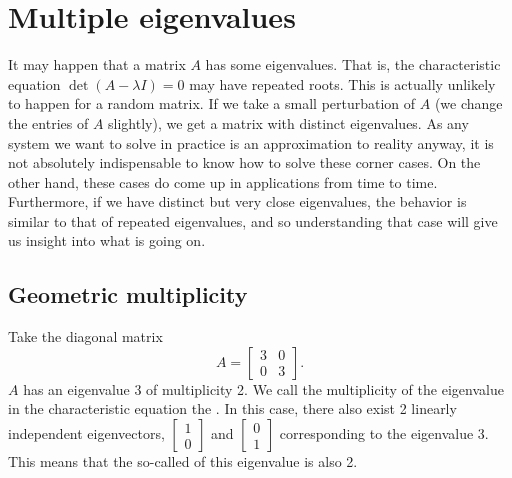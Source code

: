 
\sectionnewpage
\section{Multiple eigenvalues} \label{sec:multeigen}


It may happen that a matrix $A$ has some  eigenvalues.
That is, the characteristic equation $\det(A-\lambda I) = 0$ may have
repeated roots.  This is actually unlikely to happen
for a random matrix.  If we take a small perturbation of $A$ (we change the
entries of $A$ slightly), we get a matrix with distinct eigenvalues.  As
any system we want to solve in practice is an approximation to reality
anyway, it is not absolutely indispensable to know how to solve these
corner cases.  
On the other hand, these cases do come up in applications from time to time.
Furthermore, if we have distinct but very close eigenvalues, the behavior is
similar to that of repeated eigenvalues, and so understanding that case
will give us insight into what is going on.

\subsection{Geometric multiplicity}

Take the diagonal matrix
\begin{equation*}
A =
\begin{bmatrix}
3 & 0 \\ 0 & 3
\end{bmatrix} .
\end{equation*}
$A$ has an eigenvalue 3 of multiplicity 2.  We call the
multiplicity of the eigenvalue
in the characteristic equation the
\emph{}.  In this case, there also exist 2
linearly
independent eigenvectors,
$\left[ \begin{smallmatrix} 1 \\ 0 \end{smallmatrix} \right]$
and
$\left[ \begin{smallmatrix} 0 \\ 1 \end{smallmatrix} \right]$ corresponding
to the eigenvalue 3.  This means
that the so-called \emph{}
of this eigenvalue is also 2.

